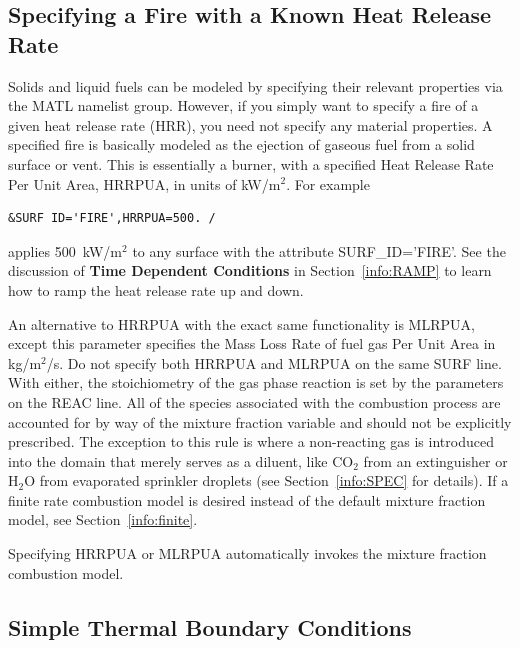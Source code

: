 \documentclass[11pt]{book}
\begin{document}
\subsection{Specifying a Fire with a Known Heat Release Rate}

Solids and liquid fuels can be modeled by specifying their relevant
properties via the {\ct MATL} namelist group. However, if you simply
want to specify a fire of a given heat release rate (HRR),
you need not specify any material properties. A specified fire is
basically modeled as the ejection of gaseous fuel
from a solid surface or vent. This is essentially a burner, with a
specified Heat Release Rate Per Unit Area, {\ct HRRPUA}, in units of
kW/m$^2$. For example

\footnotesize
\begin{verbatim}
&SURF ID='FIRE',HRRPUA=500. /
\end{verbatim}
\normalsize

\noindent
applies 500~kW/m$^2$ to any surface with the attribute
{\ct SURF\_ID='FIRE'}. See the discussion of {\bf Time Dependent Conditions}
in Section~\ref{info:RAMP} to learn how to ramp the heat release rate up and down.

An alternative to {\ct HRRPUA} with the exact same functionality is
{\ct MLRPUA}, except this parameter
specifies the Mass Loss Rate of fuel gas Per Unit Area in kg/m$^2$/s. Do not specify both
{\ct HRRPUA} and {\ct MLRPUA} on the same {\ct SURF} line. With either,
the stoichiometry of the gas phase reaction is set by the
parameters on the {\ct REAC} line. All of the
species associated with the combustion process are accounted for
by way of the mixture fraction variable and should not be
explicitly prescribed. The exception to this rule is
where a non-reacting gas is introduced into the domain that merely serves
as a diluent, like CO$_2$ from an extinguisher or H$_2$O from evaporated
sprinkler droplets (see Section~\ref{info:SPEC} for details).
If a finite rate combustion model is desired instead of the default mixture
fraction model, see Section~\ref{info:finite}.

\begin{warning}
Specifying {\ct HRRPUA} or {\ct MLRPUA} automatically invokes the mixture fraction
combustion model.
\end{warning}



\subsection{Simple Thermal Boundary Conditions}
\label{info:thermalboundary}
\end{document}
